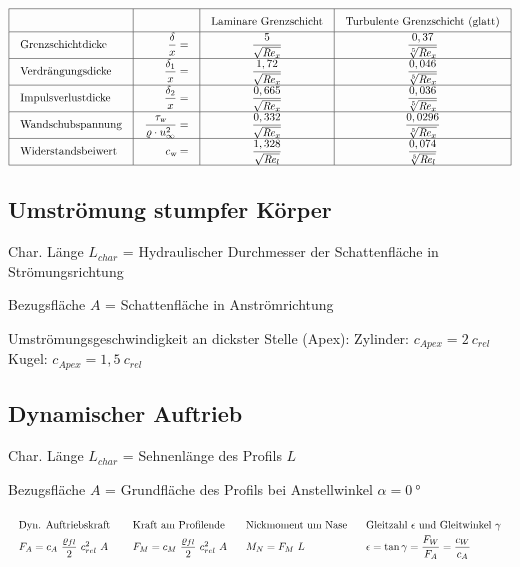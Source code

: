 	\[ \arraycolsep=1em\def\arraystretch{1.7}
	\begin{array}{|l|r|c|c|}
		\hline
		\quad                     & \quad                                                    & \text{Laminare Grenzschicht}  & \text{Turbulente Grenzschicht (glatt)} \\ \hline
		\text{Grenzschichtdicke}  & \dfrac{\delta}{x}                                      = & \dfrac{5}{\sqrt{\Reyn_x}}     & \dfrac{0,37}{\sqrt[5]{\Reyn_x}}        \\ \hline
		\text{Verdrängungsdicke}  & \dfrac{\delta_1}{x}                                    = & \dfrac{1,72}{\sqrt{\Reyn_x}}  & \dfrac{0,046}{\sqrt[5]{\Reyn_x}}       \\ \hline
		\text{Impulsverlustdicke} & \dfrac{\delta_2}{x}                                    = & \dfrac{0,665}{\sqrt{\Reyn_x}} & \dfrac{0,036}{\sqrt[5]{\Reyn_x}}       \\ \hline
		\text{Wandschubspannung}  & \dfrac{\tau_{\textsl{w}}}{\varrho \cdot u^2_{\infty}}  = & \dfrac{0,332}{\sqrt{\Reyn_x}} & \dfrac{0,0296}{\sqrt[5]{\Reyn_x}}      \\ \hline
		\text{Widerstandsbeiwert} & c_{\textsl{w}}                                         = & \dfrac{1,328}{\sqrt{\Reyn_l}} & \dfrac{0,074}{\sqrt[5]{\Reyn_l}}       \\ \hline
	\end{array} \]
	
	\clearpage
\subsection{Umströmung stumpfer Körper}
	Char. Länge $ L_{char} $ = Hydraulischer Durchmesser der Schattenfläche in Strömungsrichtung
	
	Bezugsfläche $ A $ = Schattenfläche in Anströmrichtung
	
	Umströmungsgeschwindigkeit an dickster Stelle (Apex): Zylinder: $ c_{Apex}= 2\ c_{rel} $\quad Kugel: $ c_{Apex}= 1,5\ c_{rel}  $

\subsection{Dynamischer Auftrieb}
	Char. Länge $ L_{char} $ = Sehnenlänge des Profils $ L $	
	
	Bezugsfläche $ A $ = Grundfläche des Profils bei Anstellwinkel $ \alpha = \qty{0}{\degree} $
	
	\[\arraycolsep=0.9em %
		\begin{array}{llll}
			\text{Dyn. Auftriebskraft }                          & \text{Kraft am Profilende}                           & \text{Nickmoment um Nase} & \text{Gleitzahl } \epsilon \text{ und Gleitwinkel } \gamma  \\
			F_A = c_A\ \dfrac{{\varrho}_{fl}} {2}\ c_{rel}^2 \ A & F_M = c_M\ \dfrac{{\varrho}_{fl}} {2}\ c_{rel}^2 \ A & M_N = F_M\ L              & \epsilon = \tan\gamma = \dfrac{F_W}{F_A} = \dfrac{c_W}{c_A}
		\end{array} \]

